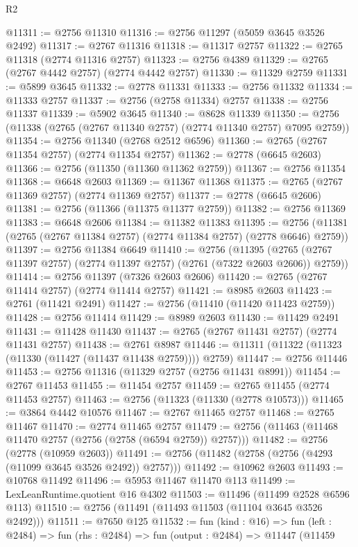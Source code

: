 \begin{lexlean}{R2}
\begin{coremodule}
@11311 := @2756 @11310
@11316 := @2756 @11297 (@5059 @3645 @3526 @2492)
@11317 := @2767 @11316
@11318 := @11317 @2757
@11322 := @2765 @11318 (@2774 @11316 @2757)
@11323 := @2756 @4389
@11329 := @2765 (@2767 @4442 @2757) (@2774 @4442 @2757)
@11330 := @11329 @2759
@11331 := @5899 @3645
@11332 := @2778 @11331
@11333 := @2756 @11332
@11334 := @11333 @2757
@11337 := @2756 (@2758 @11334) @2757
@11338 := @2756 @11337
@11339 := @5902 @3645
@11340 := @8628 @11339
@11350 := @2756 (@11338 (@2765 (@2767 @11340 @2757) (@2774 @11340 @2757) @7095 @2759))
@11354 := @2756 @11340 (@2768 @2512 @6596)
@11360 := @2765 (@2767 @11354 @2757) (@2774 @11354 @2757)
@11362 := @2778 (@6645 @2603)
@11366 := @2756 (@11350 (@11360 @11362 @2759))
@11367 := @2756 @11354
@11368 := @6648 @2603
@11369 := @11367 @11368
@11375 := @2765 (@2767 @11369 @2757) (@2774 @11369 @2757)
@11377 := @2778 (@6645 @2606)
@11381 := @2756 (@11366 (@11375 @11377 @2759))
@11382 := @2756 @11369
@11383 := @6648 @2606
@11384 := @11382 @11383
@11395 := @2756 (@11381 (@2765 (@2767 @11384 @2757) (@2774 @11384 @2757) (@2778 @6646) @2759))
@11397 := @2756 @11384 @6649
@11410 := @2756
    (@11395 (@2765 (@2767 @11397 @2757) (@2774 @11397 @2757) (@2761 (@7322 @2603 @2606)) @2759))
@11414 := @2756 @11397 (@7326 @2603 @2606)
@11420 := @2765 (@2767 @11414 @2757) (@2774 @11414 @2757)
@11421 := @8985 @2603
@11423 := @2761 (@11421 @2491)
@11427 := @2756 (@11410 (@11420 @11423 @2759))
@11428 := @2756 @11414
@11429 := @8989 @2603
@11430 := @11429 @2491
@11431 := @11428 @11430
@11437 := @2765 (@2767 @11431 @2757) (@2774 @11431 @2757)
@11438 := @2761 @8987
@11446 := @11311 (@11322 (@11323 (@11330 (@11427 (@11437 @11438 @2759)))) @2759)
@11447 := @2756 @11446
@11453 := @2756 @11316 (@11329 @2757 (@2756 @11431 @8991))
@11454 := @2767 @11453
@11455 := @11454 @2757
@11459 := @2765 @11455 (@2774 @11453 @2757)
@11463 := @2756 (@11323 (@11330 (@2778 @10573)))
@11465 := @3864 @4442 @10576
@11467 := @2767 @11465 @2757
@11468 := @2765 @11467
@11470 := @2774 @11465 @2757
@11479 := @2756 (@11463 (@11468 @11470 @2757 (@2756 (@2758 (@6594 @2759)) @2757)))
@11482 := @2756 (@2778 (@10959 @2603))
@11491 := @2756 (@11482 (@2758 (@2756 (@4293 (@11099 @3645 @3526 @2492)) @2757)))
@11492 := @10962 @2603
@11493 := @10768 @11492
@11496 := @5953 @11467 @11470 @113
@11499 := LexLeanRuntime.quotient @16 @4302
@11503 := @11496 (@11499 @2528 @6596 @113)
@11510 := @2756 (@11491 (@11493 @11503 (@11104 @3645 @3526 @2492)))
@11511 := @7650 @125
@11532 := fun (kind : @16) =>
  fun (left : @2484) =>
  fun (rhs : @2484) =>
  fun (output : @2484) =>
  @11447
    (@11459

\end{coremodule}
\end{lexlean}
